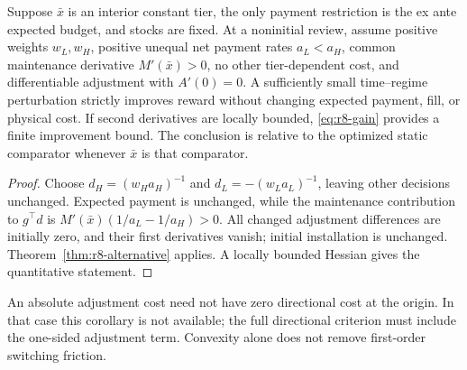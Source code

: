 \begin{corollary}\label{cor:r8-smooth}
Suppose $\bar x$ is an interior constant tier, the only payment restriction is the ex ante expected budget, and stocks are fixed. At a noninitial review, assume positive weights $w_L,w_H$, positive unequal net payment rates $a_L<a_H$, common maintenance derivative $M'(\bar x)>0$, no other tier-dependent cost, and differentiable adjustment with $A'(0)=0$. A sufficiently small time--regime perturbation strictly improves reward without changing expected payment, fill, or physical cost. If second derivatives are locally bounded, \eqref{eq:r8-gain} provides a finite improvement bound. The conclusion is relative to the optimized static comparator whenever $\bar x$ is that comparator.
\end{corollary}
\begin{proof}
Choose $d_H=(w_Ha_H)^{-1}$ and $d_L=-(w_La_L)^{-1}$, leaving other decisions unchanged. Expected payment is unchanged, while the maintenance contribution to $g^\top d$ is
$M'(\bar x)(1/a_L-1/a_H)>0$. All changed adjustment differences are initially zero, and their first derivatives vanish; initial installation is unchanged. Theorem~\ref{thm:r8-alternative} applies. A locally bounded Hessian gives the quantitative statement.
\end{proof}
An absolute adjustment cost need not have zero directional cost at the origin. In that case this corollary is not available; the full directional criterion must include the one-sided adjustment term. Convexity alone does not remove first-order switching friction.

